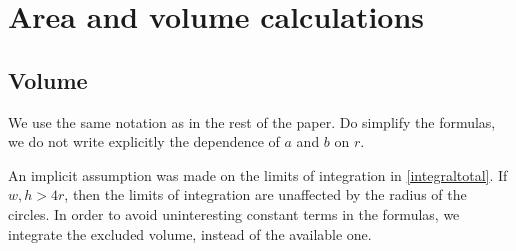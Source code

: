 \documentclass[superscriptaddress,pre,reprint,showpacs,onecolumn]{revtex4-1}
\begin{document}
\appendix
\section{Area and volume calculations}
\label{app:area_volume}

\subsection{Volume}\label{VolApen}

We use the same notation as in the rest of the paper.
Do simplify the formulas, we do not write explicitly the dependence of $a$ and $b$ on $r$.

An implicit assumption was made on the limits of integration in \eqref{integraltotal}. If $w, h > 4r$, then the limits of integration
are unaffected by the radius of the circles.
In order to avoid uninteresting constant terms
in the formulas, we integrate
the excluded volume, instead of the available one. 
\end{document}
